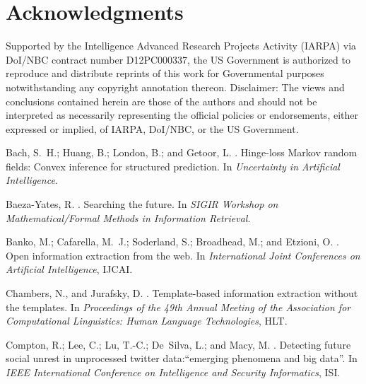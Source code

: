 \documentclass[letterpaper]{article}
\begin{document}
\section*{Acknowledgments}
Supported by the Intelligence Advanced Research Projects Activity (IARPA) via
DoI/NBC contract number D12PC000337, the US Government is authorized to
reproduce and distribute reprints of this work for Governmental purposes
notwithstanding any copyright annotation thereon.  Disclaimer: The views and
conclusions contained herein are those of the authors and should not be
interpreted as necessarily representing the official policies or endorsements,
either expressed or implied, of IARPA, DoI/NBC, or the US Government.
\begin{thebibliography}{}

Bach, S.~H.; Huang, B.; London, B.; and Getoor, L.
.
\newblock Hinge-loss {M}arkov random fields: Convex inference for structured
  prediction.
\newblock In {\em Uncertainty in Artificial Intelligence}.

Baeza-Yates, R.
.
\newblock Searching the future.
\newblock In {\em SIGIR Workshop on Mathematical/Formal Methods in Information
  Retrieval}.

Banko, M.; Cafarella, M.~J.; Soderland, S.; Broadhead, M.; and Etzioni, O.
.
\newblock Open information extraction from the web.
\newblock In {\em International Joint Conferences on Artificial Intelligence},
  IJCAI.

Chambers, N., and Jurafsky, D.
.
\newblock Template-based information extraction without the templates.
\newblock In {\em Proceedings of the 49th Annual Meeting of the Association for
  Computational Linguistics: Human Language Technologies}, HLT.

Compton, R.; Lee, C.; Lu, T.-C.; De~Silva, L.; and Macy, M.
.
\newblock Detecting future social unrest in unprocessed twitter
  data:“emerging phenomena and big data”.
\newblock In {\em IEEE International Conference on Intelligence and Security
  Informatics}, ISI.


\end{thebibliography}
\end{document}
